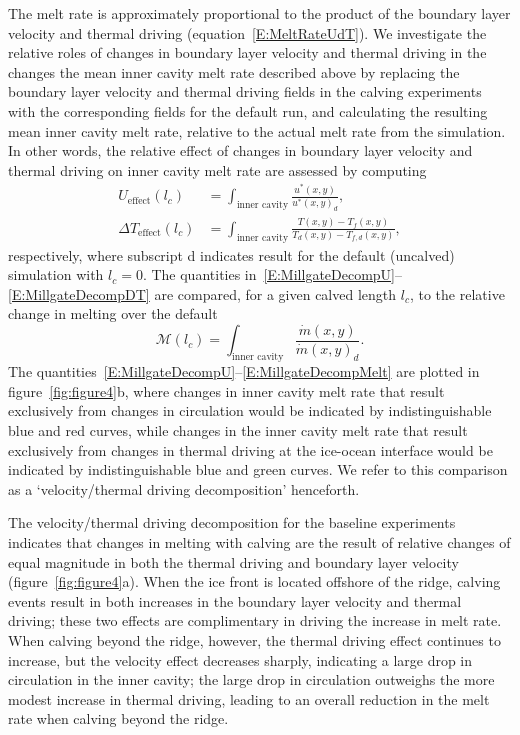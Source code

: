 \documentclass[draft]{agujournal2019}
\begin{document}
The melt rate is approximately proportional to the product of the boundary layer velocity and thermal driving (equation~\eqref{E:MeltRateUdT}). We investigate the relative roles of changes in boundary layer velocity and thermal driving in the changes the mean inner cavity melt rate described above by replacing the boundary layer velocity and thermal driving fields in the calving experiments with the corresponding fields for the default run, and calculating the resulting mean inner cavity melt rate, relative to the actual melt rate from the simulation. In other words, the relative effect of changes in boundary layer velocity and thermal driving on inner cavity melt rate are assessed by computing
 \begin{align}
U_{\text{effect}}(l_c) &=  \int_{\text{inner cavity}}\frac{u^*(x,y)}{u^*(x,y)_d}, \label{E:MillgateDecompU}\\ \Delta T_{\text{effect}}(l_c) &= \int_{\text{inner cavity}}\frac{T(x,y) - T_f(x,y)}{T_d(x,y) - T_{f,d}(x,y)},\label{E:MillgateDecompDT}
 \end{align}
  respectively, where subscript d indicates result for the default (uncalved) simulation with $l_c = 0$. The quantities in~\eqref{E:MillgateDecompU}--\eqref{E:MillgateDecompDT} are compared, for a given calved length $l_c$, to the relative change in melting over the default
 \begin{equation}\label{E:MillgateDecompMelt}
   \mathcal{M}(l_c) =  \int_{\text{inner cavity}}\frac{\dot{m}(x,y)}{\dot{m}(x,y)_d}.
 \end{equation}
The quantities~\eqref{E:MillgateDecompU}--\eqref{E:MillgateDecompMelt} are plotted in figure~\ref{fig:figure4}b, where changes in inner cavity melt rate that result exclusively from changes in circulation would be indicated by indistinguishable blue and red curves, while changes in the inner cavity melt rate that result exclusively from changes in thermal driving at the ice-ocean interface would be indicated by indistinguishable blue and green curves. We refer to this comparison as a `velocity/thermal driving decomposition' henceforth.

The velocity/thermal driving decomposition for the baseline experiments indicates that changes in melting with calving are the result of relative changes of equal magnitude in both the thermal driving and boundary layer velocity (figure~\ref{fig:figure4}a). When the ice front is located offshore of the ridge, calving events result in both increases in the boundary layer velocity and thermal driving; these two effects are complimentary in driving the increase in melt rate. When calving beyond the ridge, however, the thermal driving effect continues to increase, but the velocity effect decreases sharply, indicating a large drop in circulation in the inner cavity; the large drop in circulation outweighs the more modest increase in thermal driving, leading to an overall reduction in the melt rate when calving beyond the ridge.
\end{document}
